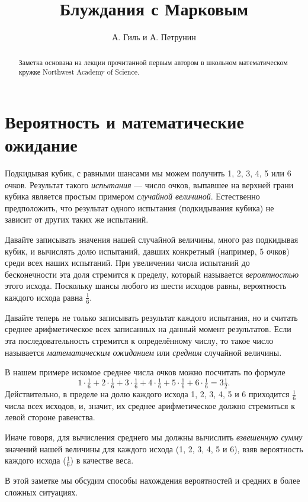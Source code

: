 \documentclass{article}
\begin{document}
\title{Блуждания с Марковым}
\author{А. Гиль и А. Петрунин}
\date{}
\maketitle
\begin{abstract}
Заметка основана на лекции прочитанной первым автором в школьном 
математическом кружке Northwest Academy of Science.
\end{abstract}

\section{Вероятность и математические ожидание}

Подкидывая кубик,
с равными шансами мы можем получить 1, 2, 3, 4, 5 или 6 очков.
Результат такого \emph{испытания} --- число очков, выпавшее на 
верхней грани кубика является простым примером \emph{случайной величиной}.
Естественно предположить, что результат одного испытания (подкидывания кубика)
не зависит от других таких же испытаний.


Давайте записывать значения нашей случайной величины, много раз подкидывая кубик,
и вычислять долю испытаний, давших конкретный (например, 5 очков) среди всех наших испытаний.
При увеличении числа испытаний до бесконечности эта доля стремится к пределу, 
который называется \emph{вероятностью} этого исхода.
Поскольку шансы любого из шести исходов равны, вероятность каждого исхода равна $\tfrac16$.

Давайте теперь не только записывать результат каждого испытания, но и считать среднее
арифметическое всех записанных на данный момент результатов. Если эта последовательность стремится к
определённому числу, то такое число называется \emph{математическим ожиданием} или \emph{средним}
случайной величины.

В нашем примере искомое среднее числа очков можно посчитать по формуле
\[1\cdot\tfrac16+2\cdot\tfrac16+3\cdot\tfrac16+4\cdot\tfrac16+5\cdot\tfrac16+6\cdot\tfrac16=3\tfrac12.\]
Действительно, в пределе на долю каждого исхода 1, 2, 3, 4, 5 и 6
приходится $\tfrac16$ числа всех исходов, и, значит, их среднее арифметическое должно 
стремиться к левой стороне равенства.

Иначе говоря, для вычисления среднего мы должны вычислить \emph{взвешенную сумму} значений нашей величины
для каждого исхода (1, 2, 3, 4, 5 и 6), взяв вероятность каждого исхода ($\tfrac16$) в качестве веса.

В этой заметке мы обсудим способы нахождения вероятностей и средних в более сложных ситуациях.
\end{document}
